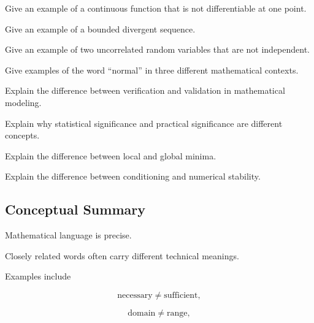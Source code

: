 \begin{exercise}[2]
Give an example of a continuous function that is not differentiable at one
point.
\end{exercise}

\begin{exercise}[2]
Give an example of a bounded divergent sequence.
\end{exercise}

\begin{exercise}[2]
Give an example of two uncorrelated random variables that are not independent.
\end{exercise}

\begin{exercise}[2]
Give examples of the word ``normal'' in three different mathematical
contexts.
\end{exercise}

\begin{exercise}[2]
Explain the difference between verification and validation in mathematical
modeling.
\end{exercise}

\begin{exercise}[2]
Explain why statistical significance and practical significance are
different concepts.
\end{exercise}

\begin{exercise}[2]
Explain the difference between local and global minima.
\end{exercise}

\begin{exercise}[2]
Explain the difference between conditioning and numerical stability.
\end{exercise}

\subsection{Conceptual Summary}
\label{subsec:mathematical-terminology-summary}

Mathematical language is precise.

Closely related words often carry different technical meanings.

Examples include

\[
\boxed{
\text{necessary}
\neq
\text{sufficient},
}
\]

\[
\boxed{
\text{domain}
\neq
\text{range},
}
\]

